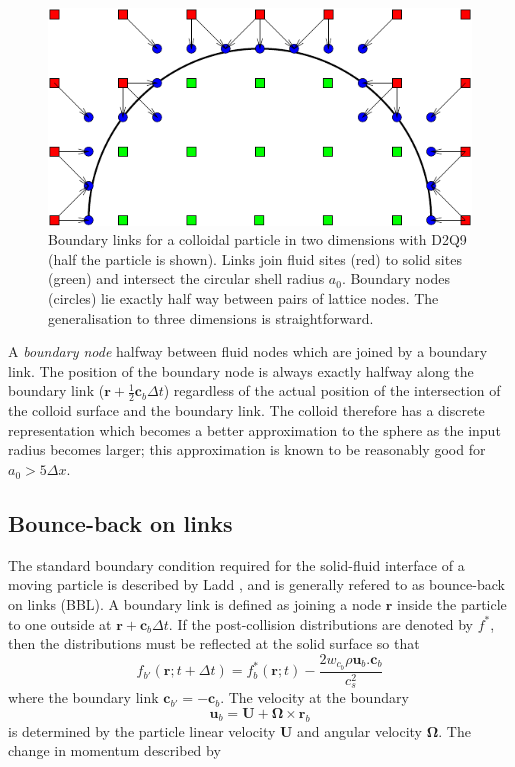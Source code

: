 \begin{figure}[tb]
\begin{center}
\includegraphics{xfig/colloidhalflinksnew-eps-converted-to.pdf}
\end{center}
\caption{Boundary links for a colloidal particle in two dimensions
with D2Q9 (half the particle is shown). Links join fluid sites (red)
to solid sites (green) and
intersect the circular shell radius $a_0$. Boundary nodes (circles)
lie exactly half way between pairs of lattice nodes. The generalisation
to three dimensions is straightforward.}
\label{fig_coll2}
\end{figure}

A \textit{boundary node} halfway between fluid nodes which are joined
by a boundary link. The position of the boundary node is always
exactly halfway along the boundary link ($\mathbf{r} + \frac{1}{2}\mathbf{c}_b
\Delta t$) regardless of the actual position of the intersection
of the colloid surface and the boundary link.
The colloid therefore has a discrete representation which becomes a
better approximation to the sphere as the input radius becomes larger;
this approximation is known to be reasonably good for $a_0 > 5\Delta x$.



\subsection{Bounce-back on links}

The standard boundary condition required for the solid-fluid
interface of a moving particle is described by Ladd \cite{l94b},
and is generally refered to as bounce-back on links (BBL).
A boundary link is defined as joining a node $\mathbf{r}$
inside the particle to one outside at $\mathbf{r} + \mathbf{c}_b \Delta t$.
If the post-collision distributions are denoted by $f^\ast$, then
the distributions must be reflected at the solid surface so that
\begin{equation}
\label{eq:bbl1}
f_{b'}(\mathbf{r}; t + \Delta t) = f_b^\ast (\mathbf{r}; t)
- \frac{2w_{c_b} \rho \mathbf{u}_b.\mathbf{c}_b}{c_s^2}
\end{equation}
where the boundary link $\mathbf{c}_{b'} = -\mathbf{c}_b$. The velocity
at the boundary
\begin{equation}
\label{eq:ub}
\mathbf{u}_b = \mathbf{U} + \mathbf{\Omega}\times\mathbf{r}_b
\end{equation}
is determined by the particle linear velocity $\mathbf{U}$ and angular
velocity $\mathbf{\Omega}$. The change in momentum described by

